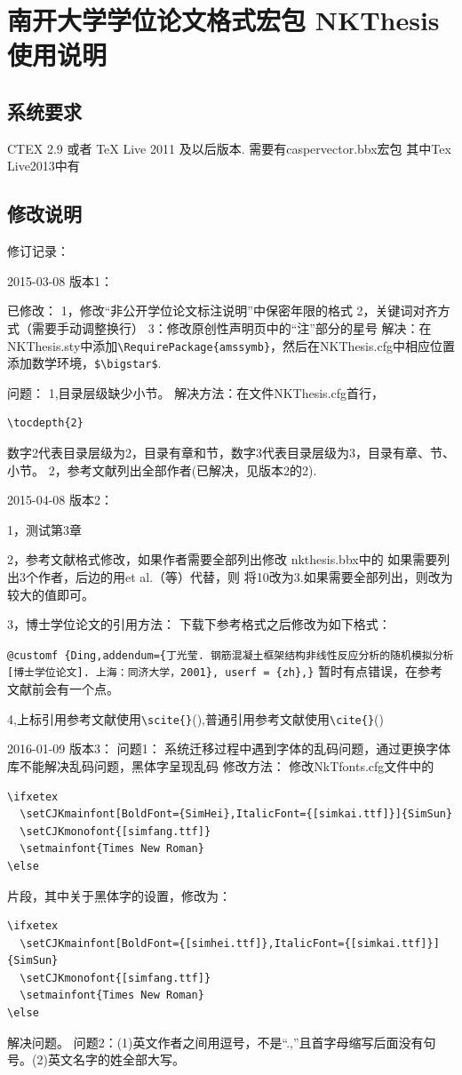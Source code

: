 
\chapter{南开大学学位论文格式宏包 NKThesis 使用说明} \label{chpt:A}

\section{系统要求}

CTEX 2.9 或者 TeX Live 2011 及以后版本.
需要有caspervector.bbx宏包
其中Tex Live2013中有
\section{修改说明}

修订记录：

2015-03-08
版本1：

已修改：
1，修改“非公开学位论文标注说明”中保密年限的格式
2，关键词对齐方式（需要手动调整换行）
3：修改原创性声明页中的“注”部分的星号
解决：在NKThesis.sty中添加\verb|\RequirePackage{amssymb}|，然后在NKThesis.cfg中相应位置添加数学环境，\verb|$\bigstar$|.

问题：
1,目录层级缺少小节。
解决方法：在文件NKThesis.cfg首行，
\begin{verbatim}
\tocdepth{2}
\end{verbatim}
数字2代表目录层级为2，目录有章和节，数字3代表目录层级为3，目录有章、节、小节。
2，参考文献列出全部作者(已解决，见版本2的2).

2015-04-08
版本2：

1，测试第3章

2，参考文献格式修改，如果作者需要全部列出修改
nkthesis.bbx中的
 \setcounter{liststop}{10}%
如果需要列出3个作者，后边的用et al.（等）代替，则
将10改为3.如果需要全部列出，则改为较大的值即可。

3，博士学位论文的引用方法：
下载下参考格式之后修改为如下格式：

\verb|@customf {Ding,addendum={丁光莹. 钢筋混凝土框架结构非线性反应分析的随机模拟分析[博士学位论文]. 上海：同济大学，2001}, userf = {zh},}|
暂时有点错误，在参考文献前会有一个点。

4,上标引用参考文献使用\verb|\scite{}|(\scite{}),普通引用参考文献使用\verb|\cite{}|(\cite{})

2016-01-09
版本3：
问题1：
系统迁移过程中遇到字体的乱码问题，通过更换字体库不能解决乱码问题，黑体字呈现乱码
修改方法：
修改NkTfonts.cfg文件中的
\begin{verbatim}
\ifxetex
  \setCJKmainfont[BoldFont={SimHei},ItalicFont={[simkai.ttf]}]{SimSun}
  \setCJKmonofont{[simfang.ttf]}
  \setmainfont{Times New Roman}
\else
\end{verbatim}
片段，其中关于黑体字的设置，修改为：
\begin{verbatim}
\ifxetex
  \setCJKmainfont[BoldFont={[simhei.ttf]},ItalicFont={[simkai.ttf]}]{SimSun}
  \setCJKmonofont{[simfang.ttf]}
  \setmainfont{Times New Roman}
\else
\end{verbatim}
解决问题。
问题2：(1)英文作者之间用逗号，不是“.,”且首字母缩写后面没有句号。(2)英文名字的姓全部大写。

